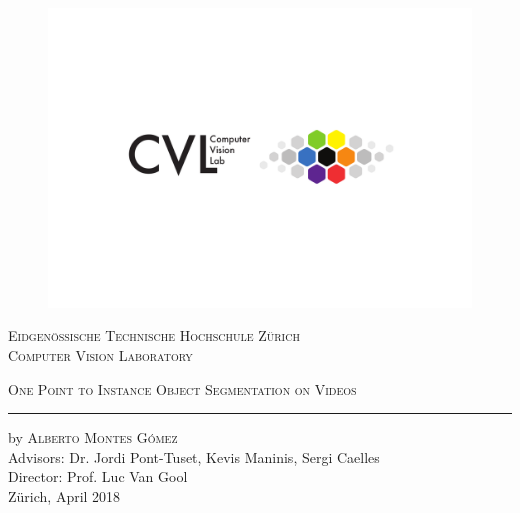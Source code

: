 
\begin{titlingpage}
\begin{center}

\begin{figure}
  \includegraphics[trim={0 6cm 0 4cm},clip,width=1\linewidth]{figures/cvl_logo.pdf}
\end{figure}

{\selectfont
\large{\textsc{Eidgen\"ossische Technische Hochschule Z\"urich\\[1mm]
Computer Vision Laboratory\\[25mm]}}

\huge{\textsc{One Point to Instance Object Segmentation on Videos}}
\vskip 0.5cm
\hrule
\vskip 2.6cm

\Large
by \textsc{Alberto Montes G\'omez}\\[2cm]

\large
Advisors: Dr. Jordi Pont-Tuset, Kevis Maninis, Sergi Caelles\\
Director: Prof. Luc Van Gool\\
Z\"urich, April 2018}
\end{center}
\end{titlingpage}
